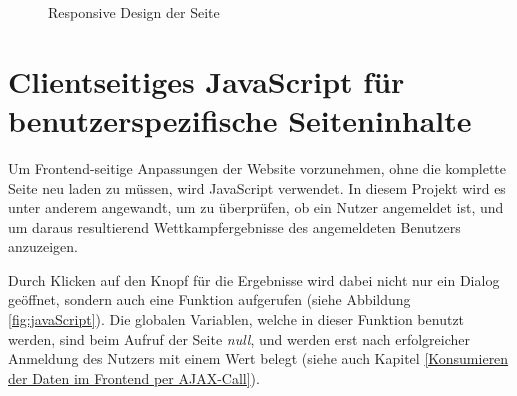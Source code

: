 \begin{figure}[!h]
	\caption{Responsive Design der Seite}
	\label{fig:responsive}
\end{figure}

\section{Clientseitiges JavaScript für benutzerspezifische Seiteninhalte}
\label{Clientseitiges JavaScript}
Um Frontend-seitige Anpassungen der Website vorzunehmen, ohne die komplette Seite neu laden zu müssen, wird JavaScript verwendet. In diesem Projekt wird es unter anderem angewandt, um zu überprüfen, ob ein Nutzer angemeldet ist, und um daraus resultierend Wettkampfergebnisse des angemeldeten Benutzers anzuzeigen.
\par
Durch Klicken auf den Knopf für die Ergebnisse wird dabei nicht nur ein Dialog geöffnet, sondern auch eine Funktion aufgerufen (siehe Abbildung \vref{fig:javaScript}). Die globalen Variablen, welche in dieser Funktion benutzt werden, sind beim Aufruf der Seite \textit{null}, und werden erst nach erfolgreicher Anmeldung des Nutzers mit einem Wert belegt (siehe auch Kapitel \vref{Konsumieren der Daten im Frontend per AJAX-Call}).

